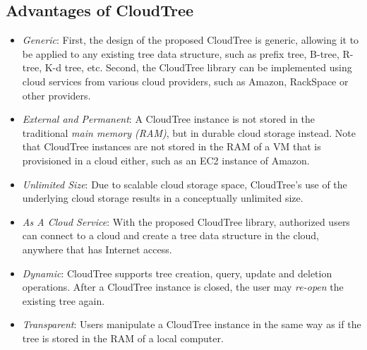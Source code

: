 \documentclass[10pt, conference, compsocconf]{IEEEtran}
\begin{document}
\subsection{Advantages of CloudTree}
\begin{itemize}
\item \emph{Generic}: First, the design of the proposed CloudTree is generic, 
allowing it to be applied to any existing tree data structure, such as prefix tree, B-tree, R-tree, K-d tree, etc.  
Second, the CloudTree library can be implemented using cloud services from various cloud providers, such as Amazon, RackSpace or other providers.
\item \emph{External and Permanent}: A CloudTree instance is not stored in the traditional \emph{main memory (RAM)}, but in durable cloud storage instead.
Note that CloudTree instances are not stored in the RAM of a VM that is provisioned in a cloud either, such as an EC2 instance of Amazon.
\item \emph{Unlimited Size}: Due to scalable cloud storage space, CloudTree's use of the underlying cloud storage results in a conceptually unlimited size.
\item \emph{As A Cloud Service}: With the proposed CloudTree library, authorized users can connect to a cloud and create a tree data structure in the cloud, anywhere that has Internet access.
\item \emph{Dynamic}: CloudTree supports tree creation, query, update and deletion operations. After a CloudTree instance is closed, the user may \emph{re-open} the existing tree again.
\item \emph{Transparent}: Users manipulate a CloudTree instance in the same way as if the tree
is stored in the RAM of a local computer. \end{itemize}
\end{document}
